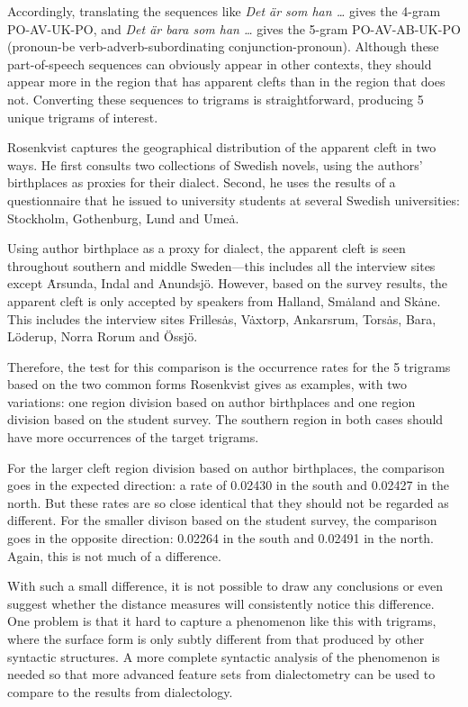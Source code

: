Accordingly, translating the sequences like {\it Det \"ar som han
  \ldots} gives the 4-gram PO-AV-UK-PO, and {\it Det \"ar bara som han
  \ldots} gives the 5-gram PO-AV-AB-UK-PO (pronoun-be
verb-adverb-subordinating conjunction-pronoun). Although these
part-of-speech sequences can obviously appear in other contexts, they
should appear more in the region that has apparent clefts than in the
region that does not. Converting these sequences to trigrams is
straightforward, producing 5 unique trigrams of interest.

Rosenkvist captures the geographical distribution of the apparent
cleft in two ways. He first consults two collections of Swedish
novels, using the authors' birthplaces as proxies for their
dialect. Second, he uses the results of a questionnaire that he issued
to university students at several Swedish universities: Stockholm,
Gothenburg, Lund and Ume\.a.

Using author birthplace as a proxy for dialect, the apparent cleft is
seen throughout southern and middle Sweden---this includes all the
interview sites except \.Arsunda, Indal and Anundsj\"o. However, based
on the survey results, the apparent cleft is only accepted by speakers
from Halland, Sm\.aland and Sk\.ane. This includes the interview sites
Frilles\.as, V\.axtorp, Ankarsrum, Tors\.as, Bara, L\"oderup, Norra
Rorum and \"Ossj\"o.

Therefore, the test for this comparison is the occurrence rates
for the 5 trigrams based on the two common forms Rosenkvist gives as
examples, with two variations: one region division based on author
birthplaces and one region division based on the student survey. The
southern region in both cases should have more occurrences of the
target trigrams.

For the larger cleft region division based on author birthplaces, the
comparison goes in the expected direction: a rate of 0.02430 in the
south and 0.02427 in the north. But these rates are so close identical
that they should not be regarded as different. For the smaller divison
based on the student survey, the comparison goes in the opposite
direction: 0.02264 in the south and 0.02491 in the north. Again, this
is not much of a difference.

With such a small difference, it is not possible to draw any
conclusions or even suggest whether the distance measures will consistently
notice this difference. One problem is that it hard to capture a
phenomenon like this with trigrams, where the surface form is only
subtly different from that produced by other syntactic structures. A
more complete syntactic analysis of the phenomenon is needed so that
more advanced feature sets from dialectometry can be used to compare
to the results from dialectology.

